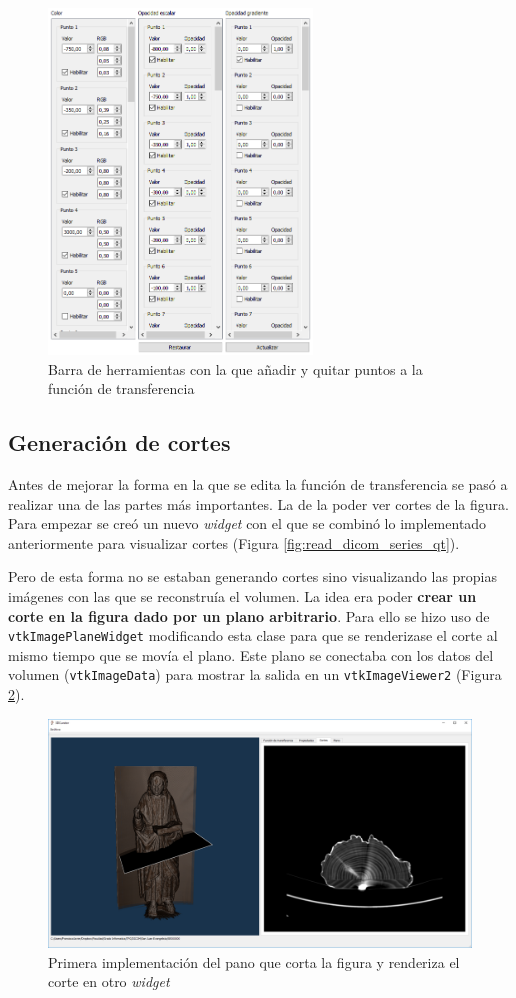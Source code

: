 \begin{figure}[H]
	\centering
	\includegraphics[width=7cm]{imagenes/gui_inicial_tf}
	\caption{Barra de herramientas con la que añadir y quitar puntos a la función de transferencia}
	\label{fig:gui_inicial_tf}
\end{figure}

\subsection{Generación de cortes}

Antes de mejorar la forma en la que se edita la función de transferencia se pasó a realizar una de las partes más importantes. La de la poder ver cortes de la figura. Para empezar se creó un nuevo \textit{widget} con el que se combinó lo implementado anteriormente para visualizar cortes (Figura \ref{fig:read_dicom_series_qt}). 

Pero de esta forma no se estaban generando cortes sino visualizando las propias imágenes con las que se reconstruía el volumen. La idea era poder \textbf{crear un corte en la figura dado por un plano arbitrario}. Para ello se hizo uso de \texttt{vtkImagePlaneWidget} modificando esta clase para que se renderizase el corte al mismo tiempo que se movía el plano. Este plano se conectaba con los datos del volumen (\texttt{vtkImageData}) para mostrar la salida en un \texttt{vtkImageViewer2} (Figura \ref{fig:primer_plano_de_corte}).

\begin{figure}[H]
	\centering
	\includegraphics[width=12cm]{imagenes/primer_plano_de_corte}
	\caption{Primera implementación del pano que corta la figura y renderiza el corte en otro \textit{widget}}
	\label{fig:primer_plano_de_corte}
\end{figure}

